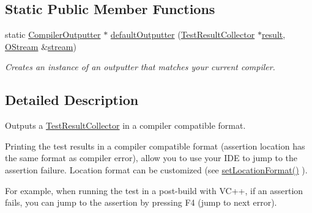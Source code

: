 \subsection*{Static Public Member Functions}
\begin{DoxyCompactItemize}
\item 
static \hyperlink{class_compiler_outputter}{Compiler\-Outputter} $\ast$ \hyperlink{class_compiler_outputter_aa0f8f9b1fb25fe8873b7454f91dcc929}{default\-Outputter} (\hyperlink{class_test_result_collector}{Test\-Result\-Collector} $\ast$\hyperlink{glew_8h_a5fb5836a37f7607602a16ad733ed6357}{result}, \hyperlink{_stream_8h_a80291a4e32881b445c8d4f839a9dd979}{O\-Stream} \&\hyperlink{glew_8h_a10d3bc96cdfc1d478f52c13d5ffd9316}{stream})
\begin{DoxyCompactList}\small\item\em Creates an instance of an outputter that matches your current compiler. \end{DoxyCompactList}\end{DoxyCompactItemize}


\subsection{Detailed Description}
Outputs a \hyperlink{class_test_result_collector}{Test\-Result\-Collector} in a compiler compatible format.

Printing the test results in a compiler compatible format (assertion location has the same format as compiler error), allow you to use your I\-D\-E to jump to the assertion failure. Location format can be customized (see \hyperlink{class_compiler_outputter_a0d9e67c7bdcb443b0b2754d61a10790c}{set\-Location\-Format()} ). 

For example, when running the test in a post-\/build with V\-C++, if an assertion fails, you can jump to the assertion by pressing F4 (jump to next error).

